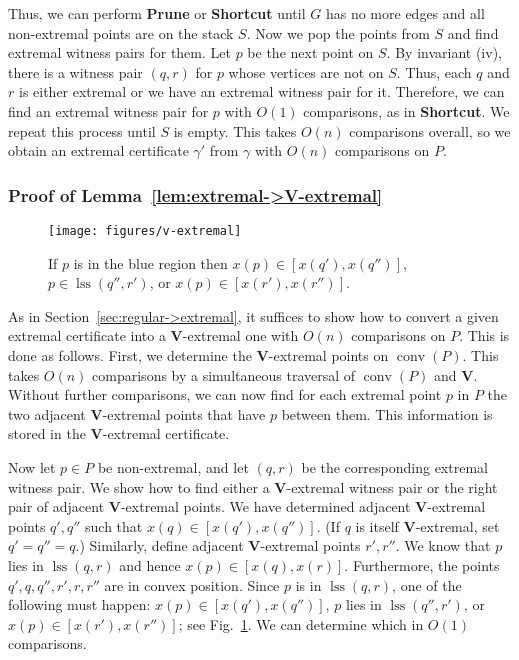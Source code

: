 \documentclass[letterpaper,11pt]{article}
\DeclareMathOperator{\UH}{conv}
\DeclareMathOperator{\lss}{lss}
\begin{document}
Thus, we can perform \textbf{Prune} or 
\textbf{Shortcut} until $G$ has no more 
edges and all non-extremal points are on 
the stack $S$.  Now we pop the points from 
$S$ and find extremal witness pairs for them.
Let $p$ be the next point on $S$.  By invariant 
(iv), there is a witness pair $(q,r)$
for $p$ whose vertices are not on $S$. Thus, 
each $q$ and $r$ is either extremal or we 
have an extremal witness pair for it.
Therefore, we can find an extremal witness 
pair for $p$ with $O(1)$ comparisons, as 
in \textbf{Shortcut}. We repeat this process 
until $S$ is empty. This takes $O(n)$ comparisons
overall, so we obtain an extremal 
certificate $\gamma'$ from $\gamma$ with $O(n)$ 
comparisons on $P$. 

\subsubsection{Proof of Lemma~\ref{lem:extremal->V-extremal}}
\label{sec:extremal->V-extremal}

\begin{figure}
  \centering
  \texttt{[image: figures/v-extremal]}
  \caption{If $p$ is in the blue region then 
    $x(p) \in [x(q'),x(q'')]$, $p \in \lss(q'',r')$, 
    or $x(p) \in [x(r'),x(r'')]$.}
  \label{fig:v-extremal}
\end{figure}

As in Section~\ref{sec:regular->extremal}, it 
suffices to show how to convert a given 
extremal certificate into a 
$\textbf{V}$-extremal one
with $O(n)$ comparisons on $P$. This 
is done as follows.  First, we determine 
the $\textbf{V}$-extremal points on 
$\UH(P)$. This takes $O(n)$
comparisons by a simultaneous traversal 
of $\UH(P)$ and $\textbf{V}$.
Without further comparisons, we can 
now find for each extremal
point $p$ in $P$ the two adjacent 
$\textbf{V}$-extremal points that
have $p$ between them. This information 
is stored in the $\textbf{V}$-extremal
certificate.

Now let $p \in P$ be non-extremal, and 
let $(q, r)$ be the corresponding
extremal witness pair. We show how 
to find either a $\textbf{V}$-extremal 
witness pair or the right pair of 
adjacent $\textbf{V}$-extremal points.
We have determined adjacent 
$\textbf{V}$-extremal points $q', q''$ 
such that $x(q) \in [x(q'), x(q'')]$. 
(If $q$ is itself $\textbf{V}$-extremal, 
set $q' = q'' = q$.) Similarly, define 
adjacent $\textbf{V}$-extremal points 
$r', r''$. We know that $p$ lies in
$\lss(q,r)$ and hence 
$x(p) \in [x(q),x(r)]$.  Furthermore, 
the points $q',q,q'',r',r,r''$ are 
in convex position.  Since $p$ is in 
$\lss(q,r)$, one of the following 
must happen: $x(p) \in [x(q'),x(q'')]$, 
$p$ lies in $\lss(q'',r')$, or 
$x(p) \in [x(r'),x(r'')]$; see 
Fig.~\ref{fig:v-extremal}.  
We can determine which in 
$O(1)$ comparisons.
\end{document}
